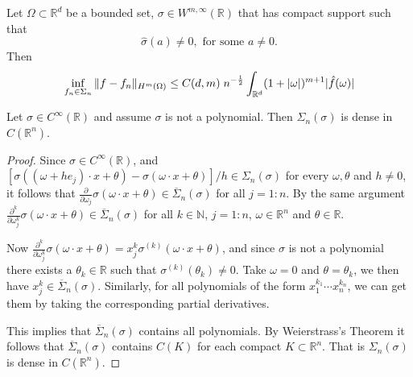 \iffalse
Given an activation function
\begin{equation}
  \label{activation}
\sigma: \mathbb R^1\mapsto \mathbb R^1  
\end{equation}
We consider the following shallow neural network function class
\begin{equation}
  \label{ShallowNN}
	\Sigma_d(\sigma)=\mathrm{span}\left\{\sigma(\omega\cdot x+\theta):\omega\in\mathbb{R}^d,\theta\in\mathbb{R}\right\}.
\end{equation}

In this chapter, we will two theorems as follows. 
\begin{theorem}
Let $\sigma$ be a non-polynomial Riemann integrable function and
$\sigma\in L_{loc}^\infty(\mathbb{R})$. Then $\Sigma_d(\sigma)$ in dense in
$C(\mathbb R^d)$.	
\end{theorem}
\fi 

\begin{theorem}
Let $\Omega\subset \mathbb{R}^d$ be a bounded set, $\sigma\in W^{m,\infty}(\mathbb R)$ that has 
compact support such that 
\begin{equation}
  \label{eq:1}
  \hat\sigma(a)\neq 0, \mbox{ for some } a\neq 0.
\end{equation}
Then
\begin{equation}
  \label{eq:2}
\inf_{f_n\in\Sigma_n}\|f-f_n\|_{H^m( \Omega)}
\le C(d,m)\;n^{-{1\over2}}\int_{\mathbb R^d}(1+|\omega|)^{m+1}|\hat f(\omega)|
\end{equation}
\end{theorem}

\iffalse
	\begin{lemma}
		Let $\sigma\in C^\infty(\mathbb{R})$ and assume $\sigma$ is not a polynomial. Then $\Sigma_n(\sigma)$ is dense in $C(\mathbb{R}^n)$.
	\end{lemma}
	\begin{proof}
		Since $\sigma\in C^\infty(\mathbb{R})$, and $[\sigma((\omega+h e_j)\cdot x+\theta)-\sigma(\omega\cdot x+\theta)]/h\in\Sigma_n(\sigma)$ for every $\omega,\theta$ and $h\ne0$, it follows that 
		$\frac{\partial}{\partial \omega_j}\sigma(\omega\cdot x+\theta)\in\overline{\Sigma}_n(\sigma)$ for all $j=1:n$. By the same argument $\frac{\partial^k}{\partial \omega^k_j}\sigma(\omega\cdot x+\theta)\in\overline{\Sigma}_n(\sigma)$ for all $k\in\mathbb{N}$, $j=1:n$, $\omega\in\mathbb{R}^n$ and $\theta\in\mathbb{R}$.
		
		Now $\frac{\partial^k}{\partial \omega^k_j}\sigma(\omega\cdot x+\theta)=x_j^k\sigma^{(k)}(\omega\cdot x+\theta)$, and since $\sigma$ is not a polynomial there exists a $\theta_k\in\mathbb{R}$ such that $\sigma^{(k)}(\theta_k)\ne0$. Take $\omega=0$ and $\theta=\theta_k$, we then have $x_j^k\in\overline{\Sigma}_n(\sigma)$. Similarly, for all polynomials of the form $x_1^{k_1}\cdots x_n^{k_n}$, we can get them by taking the corresponding partial derivatives.
		
		This implies that $\overline{\Sigma}_n(\sigma)$ contains all polynomials. By Weierstrass's Theorem it follows that $\overline{\Sigma}_n(\sigma)$ contains $C(K)$ for each compact $K\subset\mathbb{R}^n$. That is $\Sigma_n(\sigma)$ is dense in $C(\mathbb{R}^n)$.
		\end{proof}
	

